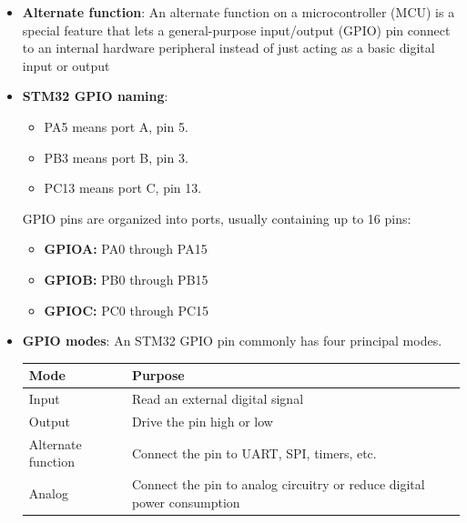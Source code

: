 \documentclass{report}
\begin{document}
\begin{itemize}
\begin{itemize}
                \item An ADC
                \item Another peripheral
            \end{itemize}
            Therefore, a pin marked PA5 does not necessarily have to act as an ordinary GPIO. It could be assigned an alternate function
        \item \textbf{Alternate function}: An alternate function on a microcontroller (MCU) is a special feature that lets a general-purpose input/output (GPIO) pin connect to an internal hardware peripheral instead of just acting as a basic digital input or output
        \item \textbf{STM32 GPIO naming}: 
            \begin{itemize}
                \item PA5 means port A, pin 5.
                \item PB3 means port B, pin 3.
                \item PC13 means port C, pin 13.
            \end{itemize}
            GPIO pins are organized into ports, usually containing up to 16 pins:
            \begin{itemize}
                \item \textbf{GPIOA:} PA0 through PA15
                \item \textbf{GPIOB:} PB0 through PB15
                \item \textbf{GPIOC:} PC0 through PC15
            \end{itemize}
        \item \textbf{GPIO modes}: An STM32 GPIO pin commonly has four principal modes.
            \begin{center}
                \begin{tabularx}{\textwidth}{@{}XX@{}}
                    \toprule
                    \textbf{Mode}&	\textbf{Purpose} \\
                    \midrule
                    Input	&Read an external digital signal\\[2ex]
                    Output	&Drive the pin high or low\\[2ex]
                    Alternate function	&Connect the pin to UART, SPI, timers, etc.\\[2ex]
                    Analog	&Connect the pin to analog circuitry or reduce digital power consumption\\
                    \bottomrule
                \end{tabularx}

\end{center}
\end{itemize}
\end{document}
